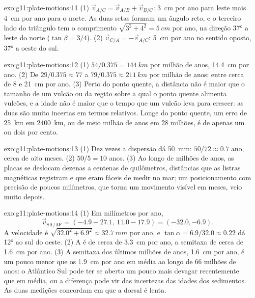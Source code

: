 \begin{solution}{exo:g11:plate-motions:11}
(1) $\vec v_{A/C} = \vec v_{A/B} + \vec v_{B/C}$: \qty{3}{cm} por ano para
leste mais \qty{4}{cm} por ano para o norte. As duas setas formam um ângulo
reto, e o terceiro lado do triângulo tem o comprimento
$\sqrt{3^2 + 4^2} = \qty{5}{cm}$ por ano, na direção \ang{37} a leste do
norte ($\tan\beta = 3/4$). (2) $\vec v_{C/A}
= -\vec v_{A/C}$: \qty{5}{cm} por ano no sentido oposto, \ang{37} a oeste
do sul.
\end{solution}

\begin{solution}{exo:g11:plate-motions:12}
(1) $54/0.375 = \qty{144}{km}$ por milhão de anos, \qty{14.4}{cm} por ano.
(2) De $29/0.375 \approx 77$ a $79/0.375 \approx \qty{211}{km}$ por milhão
de anos: entre cerca de 8 e \qty{21}{cm} por ano. (3) Perto do ponto
quente, a distância não é maior que o tamanho de um vulcão ou da região
sobre a qual o ponto quente alimenta vulcões, e a idade não é maior que o
tempo que um vulcão leva para crescer: as duas são muito incertas em termos
relativos. Longe do ponto quente, um erro de \qty{25}{km} em
\qty{2400}{km}, ou de meio milhão de anos em 28 milhões, é de apenas um ou
dois por cento.
\end{solution}

\begin{solution}{exo:g11:plate-motions:13}
(1) Dez vezes a dispersão dá \qty{50}{mm}: $50/72 \approx 0.7$ ano, cerca de
oito meses. (2) $50/5 = 10$ anos. (3) Ao longo de milhões de anos, as placas
se deslocam dezenas a centenas de quilômetros, distâncias que as listras
magnéticas registram e que eram fáceis de medir no mar; um posicionamento
com precisão de poucos milímetros, que torna um movimento visível em meses,
veio muito depois.
\end{solution}

\begin{solution}{exo:g11:plate-motions:14}
(1) Em milímetros por ano,
\[
  \vec v_{\mathrm{SA/AF}} = (-4.9 - 27.1,\ 11.0 - 17.9) = (-32.0, -6.9).
\] A velocidade é $\sqrt{32.0^2 + 6.9^2} \approx
\qty{32.7}{mm}$ por ano, e $\tan\alpha = 6.9/32.0 \approx 0.22$ dá
\ang{12} ao sul do oeste. (2) A  é de cerca de
\qty{3.3}{cm} por ano, a semitaxa de cerca de \qty{1.6}{cm} por ano. (3) A
semitaxa dos últimos milhões de anos, \qty{1.6}{cm} por ano, é um pouco
menor que os \qty{1.9}{cm} por ano em média ao longo de 66 milhões de anos:
o Atlântico Sul pode ter se aberto um pouco mais devagar recentemente que em
média, ou a diferença pode vir das incertezas das idades dos sedimentos. As
duas medições concordam em que a dorsal é lenta.
\end{solution}

